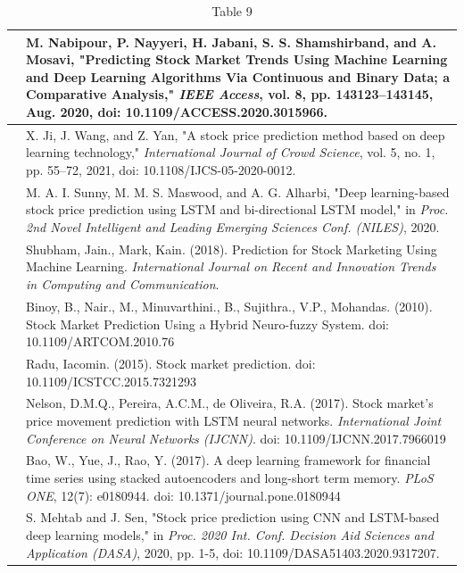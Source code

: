 \documentclass[12pt,a4paper]{report}
\begin{document}
\begin{table}[htbp]
\centering
\begin{tabular}{|l|l|}
\hline
[1] & M. Nabipour, P. Nayyeri, H. Jabani, S. S. Shamshirband, and A. Mosavi, "Predicting Stock Market Trends Using Machine Learning and Deep Learning Algorithms Via Continuous and Binary Data; a Comparative Analysis," \textit{IEEE Access}, vol. 8, pp. 143123–143145, Aug. 2020, doi: 10.1109/ACCESS.2020.3015966. \\
\hline
[2] & X. Ji, J. Wang, and Z. Yan, "A stock price prediction method based on deep learning technology," \textit{International Journal of Crowd Science}, vol. 5, no. 1, pp. 55–72, 2021, doi: 10.1108/IJCS-05-2020-0012. \\
\hline
[3] & M. A. I. Sunny, M. M. S. Maswood, and A. G. Alharbi, "Deep learning-based stock price prediction using LSTM and bi-directional LSTM model," in \textit{Proc. 2nd Novel Intelligent and Leading Emerging Sciences Conf. (NILES)}, 2020. \\
\hline
[4] & Shubham, Jain., Mark, Kain. (2018). Prediction for Stock Marketing Using Machine Learning. \textit{International Journal on Recent and Innovation Trends in Computing and Communication}. \\
\hline
[5] & Binoy, B., Nair., M., Minuvarthini., B., Sujithra., V.P., Mohandas. (2010). Stock Market Prediction Using a Hybrid Neuro-fuzzy System. doi: 10.1109/ARTCOM.2010.76 \\
\hline
[6] & Radu, Iacomin. (2015). Stock market prediction. doi: 10.1109/ICSTCC.2015.7321293 \\
\hline
[7] & Nelson, D.M.Q., Pereira, A.C.M., de Oliveira, R.A. (2017). Stock market’s price movement prediction with LSTM neural networks. \textit{International Joint Conference on Neural Networks (IJCNN)}. doi: 10.1109/IJCNN.2017.7966019 \\
\hline
[8] & Bao, W., Yue, J., Rao, Y. (2017). A deep learning framework for financial time series using stacked autoencoders and long-short term memory. \textit{PLoS}\textit{ ONE}, 12(7): e0180944. doi: 10.1371/journal.pone.0180944 \\
\hline
[9] & S. Mehtab and J. Sen, "Stock price prediction using CNN and LSTM-based deep learning models," in \textit{Proc. 2020 Int. Conf. Decision Aid Sciences and Application (DASA)}, 2020, pp. 1-5, doi: 10.1109/DASA51403.2020.9317207. \\
\hline
\end{tabular}
\caption{Table 9}
\label{tab:table9}
\end{table}
\end{document}
